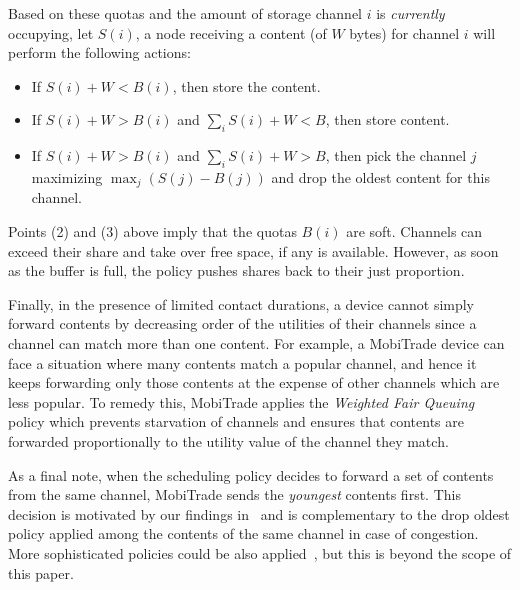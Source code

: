 Based on these quotas and the amount of storage channel $i$ is \emph{currently} occupying, let $S(i)$, a node receiving a content (of $W$ bytes) for channel $i$ will perform the following actions:
\begin{itemize}
\item If $S(i) + W < B(i)$, then store the content.
\item If $S(i) + W > B(i)$ and $\sum_{i} S(i) + W < B$, then store content.
\item If $S(i) + W > B(i)$ and $\sum_{i} S(i) + W > B$, then pick the channel $j$ maximizing $\max_{j} (S(j) - B(j))$ and drop the oldest content for this channel.
\end{itemize}

Points (2) and (3) above imply that the quotas $B(i)$ are soft. Channels can exceed their share and take over free space, if any is available. However, as soon as the buffer is full, the policy pushes shares back to their just proportion.

Finally, in the presence of limited contact durations, a device cannot simply forward contents by decreasing order of the utilities of their channels since a channel can match more than one content. For example, a MobiTrade device can face a situation where many contents match a popular channel, and hence it keeps forwarding only those contents at the expense of other channels which are less popular. To remedy this, MobiTrade applies the \emph{Weighted Fair Queuing} policy which prevents starvation of channels and ensures that contents are forwarded proportionally to the utility value of the channel they match. 

As a final note, when the scheduling policy decides to forward a set of contents from the same channel, MobiTrade sends the \emph{youngest} contents first. This decision is motivated by our findings in~\cite{TMC:Report} and is complementary to the drop oldest policy applied among the contents of the same channel in case of congestion. More sophisticated policies could be also applied~\cite{TMC:Report}, but this is beyond the scope of this paper.

